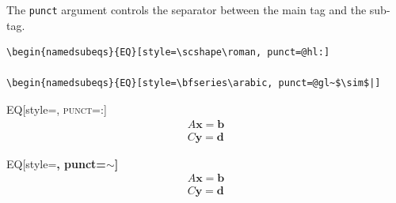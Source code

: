 \documentclass{article}
\newcommand{\hl}[1]{\colorbox{SeaGreen!30}{#1}}
\newcommand{\gl}[1]{\colorbox{Thistle!30}{#1}}
\begin{document}
The \verb|punct| argument controls the separator between the main tag and the sub-tag.
\begin{tcolorbox}
  \begin{Verbatim}
\begin{namedsubeqs}{EQ}[style=\scshape\roman, punct=@hl:]
  
\begin{namedsubeqs}{EQ}[style=\bfseries\arabic, punct=@gl~$\sim$|]

  \end{Verbatim}
\tcblower
  \begin{minipage}[T]{0.4\textwidth}
  	\begin{namedsubeqs}{EQ}[style=\scshape\roman, punct=\hl:]
    \begin{align}
      A\mathbf{x} = \mathbf{b}   \\
      C\mathbf{y} = \mathbf{d}
    \end{align}
    \end{namedsubeqs}
  \end{minipage}
  \HSKP
  \begin{minipage}[T]{0.4\textwidth}
	  \begin{namedsubeqs}{EQ}[style=\bfseries\arabic, punct=\gl{$\sim$}]
	  \begin{align}
	    A\mathbf{x} = \mathbf{b}   \\
	    C\mathbf{y} = \mathbf{d}
	  \end{align}
	  \end{namedsubeqs}
  \end{minipage}
\end{tcolorbox}
\end{document}
